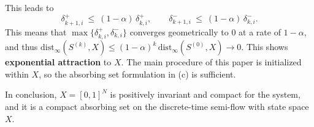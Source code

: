 \documentclass[journal]{IEEEtran}
\begin{document}
\begin{IEEEproof}
This leads to
\begin{equation}
\delta^+_{k+1,i}\ \le\ (1-\alpha)\,\delta^+_{k,i},\qquad 
\delta^-_{k+1,i}\ \le\ (1-\alpha)\,\delta^-_{k,i}.
\end{equation}
This means that $\max\{\delta^+_{k,i},\delta^-_{k,i}\}$ converges geometrically to 0 at a rate of $1-\alpha$, and thus $\mathrm{dist}_\infty(S^{(k)},X)\le (1-\alpha)^k\,\mathrm{dist}_\infty(S^{(0)},X)\to0$. This shows \textbf{exponential attraction} to $X$. The main procedure of this paper is initialized within $X$, so the absorbing set formulation in (c) is sufficient.

In conclusion, $X=[0,1]^N$ is positively invariant and compact for the system, and it is a compact absorbing set on the discrete-time semi-flow with state space $X$.
\end{IEEEproof}
\end{document}
